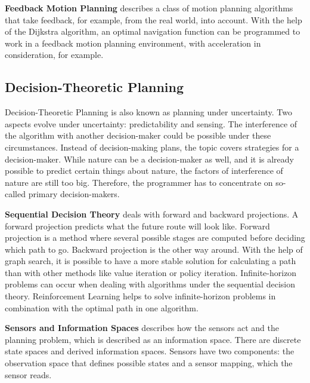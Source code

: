 \textbf{Feedback Motion Planning} describes a class of motion planning algorithms that take feedback, for example, from the real world, into account. With the help of the Dijkstra algorithm, an optimal navigation function can be programmed to work in a feedback motion planning environment, with acceleration in consideration, for example. \cite{planning_algorithms_steven_m_lavalle}

\subsection{Decision-Theoretic Planning} \label{sec:Decision-Theoretic Planning}
Decision-Theoretic Planning is also known as planning under uncertainty. Two aspects evolve under uncertainty: predictability and sensing. The interference of the algorithm with another decision-maker could be possible under these circumstances. Instead of decision-making plans, the topic covers strategies for a decision-maker. While nature can be a decision-maker as well, and it is already possible to predict certain things about nature, the factors of interference of nature are still too big. Therefore, the programmer has to concentrate on so-called primary decision-makers. \cite{planning_algorithms_steven_m_lavalle}

\textbf{Sequential Decision Theory} deals with forward and backward projections. A forward projection predicts what the future route will look like. Forward projection is a method where several possible stages are computed before deciding which path to go. Backward projection is the other way around. With the help of graph search, it is possible to have a more stable solution for calculating a path than with other methods like value iteration or policy iteration. Infinite-horizon problems can occur when dealing with algorithms under the sequential decision theory. Reinforcement Learning helps to solve infinite-horizon problems in combination with the optimal path in one algorithm. \cite{planning_algorithms_steven_m_lavalle}

\textbf{Sensors and Information Spaces} describes how the sensors act and the planning problem, which is described as an information space. There are discrete state spaces and derived information spaces. Sensors have two components: the observation space that defines possible states and a sensor mapping, which the sensor reads. \cite{planning_algorithms_steven_m_lavalle}

